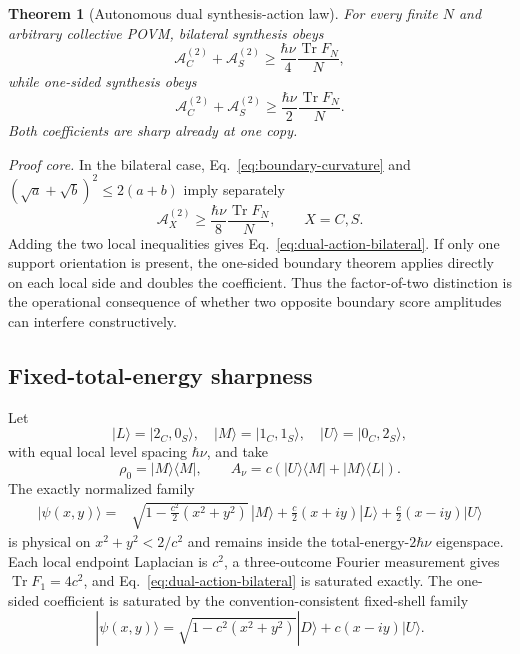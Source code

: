 \documentclass[aps,pra,preprint,nofootinbib]{revtex4-2}
\newtheorem{theorem}{Theorem}
\newcommand{\Tr}{\operatorname{Tr}}
\newcommand{\rhozero}{\rho_0}
\newcommand{\Fcl}{F}
\newcommand{\Aact}{\mathcal A}
\begin{document}
\begin{theorem}[Autonomous dual synthesis-action law]
\label{thm:dual-action}
For every finite $N$ and arbitrary collective POVM, bilateral synthesis obeys
\begin{equation}
\boxed{
\Aact_C^{(2)}+\Aact_S^{(2)}
\ge
\frac{\hbar\nu}{4}\frac{\Tr \Fcl_N}{N},
}
\label{eq:dual-action-bilateral}
\end{equation}
while one-sided synthesis obeys
\begin{equation}
\boxed{
\Aact_C^{(2)}+\Aact_S^{(2)}
\ge
\frac{\hbar\nu}{2}\frac{\Tr \Fcl_N}{N}.
}
\label{eq:dual-action-one-sided}
\end{equation}
Both coefficients are sharp already at one copy.
\end{theorem}

\emph{Proof core.} In the bilateral case, Eq.~\eqref{eq:boundary-curvature} and $(\sqrt a+\sqrt b)^2\le2(a+b)$ imply separately
\begin{equation}
\Aact_X^{(2)}\ge\frac{\hbar\nu}{8}\frac{\Tr F_N}{N},\qquad X=C,S.
\end{equation}
Adding the two local inequalities gives Eq.~\eqref{eq:dual-action-bilateral}. If only one support orientation is present, the one-sided boundary theorem applies directly on each local side and doubles the coefficient. Thus the factor-of-two distinction is the operational consequence of whether two opposite boundary score amplitudes can interfere constructively.

\subsection{Fixed-total-energy sharpness}

Let
\begin{equation}
|L\rangle=|2_C,0_S\rangle,\quad
|M\rangle=|1_C,1_S\rangle,\quad
|U\rangle=|0_C,2_S\rangle,
\end{equation}
with equal local level spacing $\hbar\nu$, and take
\begin{equation}
\rhozero=|M\rangle\!\langle M|,
\qquad
A_\nu=c(|U\rangle\!\langle M|+|M\rangle\!\langle L|).
\end{equation}
The exactly normalized family
\begin{align}
|\psi(x,y)\rangle={}&
\sqrt{1-\frac{c^2}{2}(x^2+y^2)}\,|M\rangle
+\frac c2(x+i y)|L\rangle
+\frac c2(x-i y)|U\rangle
\label{eq:bilateral-extremizer}
\end{align}
is physical on $x^2+y^2<2/c^2$ and remains inside the total-energy-$2\hbar\nu$ eigenspace. Each local endpoint Laplacian is $c^2$, a three-outcome Fourier measurement gives $\Tr F_1=4c^2$, and Eq.~\eqref{eq:dual-action-bilateral} is saturated exactly. The one-sided coefficient is saturated by the convention-consistent fixed-shell family
\begin{equation}
|\psi(x,y)\rangle
=\sqrt{1-c^2(x^2+y^2)}|D\rangle+c(x-i y)|U\rangle.
\end{equation}
\end{document}
